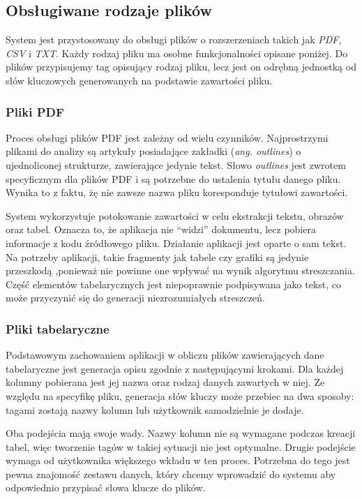 \documentclass[12pt,a4paper,twoside]{article}
\begin{document}
\subsection{Obsługiwane rodzaje plików}
System jest przystosowany do obsługi plików o rozszerzeniach takich jak \textit{PDF}, \textit{CSV} i \textit{TXT}. Każdy rodzaj pliku ma osobne funkcjonalności opisane poniżej. Do plików przypisujemy tag opisujący rodzaj pliku, lecz jest on odrębną jednostką od słów kluczowych generowanych na podstawie zawartości pliku.
\subsubsection*{Pliki PDF}
Proces obsługi plików PDF jest zależny od wielu czynników. Najprostrzymi plikami do analizy są artykuły posiadające zakładki (\textit{ang. outlines}) o ujednoliconej strukturze, zawierające jedynie tekst. Słowo \textit{outlines} jest zwrotem specyficznym dla plików PDF i są potrzebne do ustalenia tytułu danego pliku. Wynika to z faktu, żę nie zawsze nazwa pliku koresponduje tytułowi zawartości.\par
System wykorzystuje potokowanie zawartości w celu ekstrakcji tekstu, obrazów oraz tabel. Oznacza to, że aplikacja nie ``widzi'' dokumentu, lecz pobiera informacje z kodu źródłowego pliku. Działanie aplikacji jest oparte o sam tekst. Na potrzeby aplikacji, takie fragmenty jak tabele czy grafiki są jedynie przeszkodą ,ponieważ nie powinne one wpływać na wynik algorytmu streszczania. Część elementów tabelarycznych jest niepoprawnie podpisywana jako tekst, co może przyczynić się do generacji niezrozumiałych streszczeń. 
\subsubsection*{Pliki tabelaryczne}
Podstawowym zachowaniem aplikacji w obliczu plików zawierających dane tabelaryczne jest generacja opisu zgodnie z następującymi krokami. Dla każdej kolumny pobierana jest jej nazwa oraz rodzaj danych zawartych w niej. Ze względu na specyfikę pliku, generacja słów kluczy może przebiec na dwa sposoby: tagami zostają nazwy kolumn lub użytkownik samodzielnie je dodaje.\par
Oba podejścia mają swoje wady. Nazwy kolumn nie są wymagane podczas kreacji tabel, więc tworzenie tagów w takiej sytuacji nie jest optymalne. Drugie podejście wymaga od użytkownika większego wkładu w ten proces. Potrzebna do tego jest pewna znajomość zestawu danych, który chcemy wprowadzić do systemu aby odpowiednio przypisać słowa klucze do plików.
\end{document}
